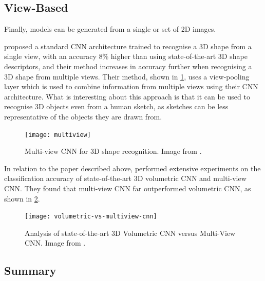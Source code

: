 
\subsection{View-Based}\label{subsec:viewbasedmodelling}

Finally, models can be generated from a single or set of 2D images. 

\citet{2015convolutionalneuralnetworks} proposed a standard CNN architecture trained to recognise a 3D shape from a single view, with an accuracy 8\% higher than using state-of-the-art 3D shape descriptors, and their method increases in accuracy further when recognising a 3D shape from multiple views. Their method, shown in \cref{fig:multiview}, uses a view-pooling layer which is used to combine information from multiple views using their CNN architecture. What is interesting about this approach is that it can be used to recognise 3D objects even from a human sketch, as sketches can be less representative of the objects they are drawn from.

\begin{figure}[ht]
  \centering
  \texttt{[image: multiview]}
  \caption{Multi-view CNN for 3D shape recognition. Image from \protect\citet{2015convolutionalneuralnetworks}.}
  \label{fig:multiview}
\end{figure}

In relation to the paper described above, \citet{2016volumetricmultiview} performed extensive experiments on the classification accuracy of state-of-the-art 3D volumetric CNN and multi-view CNN. They found that multi-view CNN far outperformed volumetric CNN, as shown in \cref{fig:volvsviewcnn}.

\begin{figure}[th]
  \centering
  \texttt{[image: volumetric-vs-multiview-cnn]}
  \caption{Analysis of state-of-the-art 3D Volumetric CNN versus Multi-View CNN. Image from \protect\citet{2016volumetricmultiview}.}
  \label{fig:volvsviewcnn}
\end{figure}


\subsection{Summary}\label{sec:categoriessummary}


